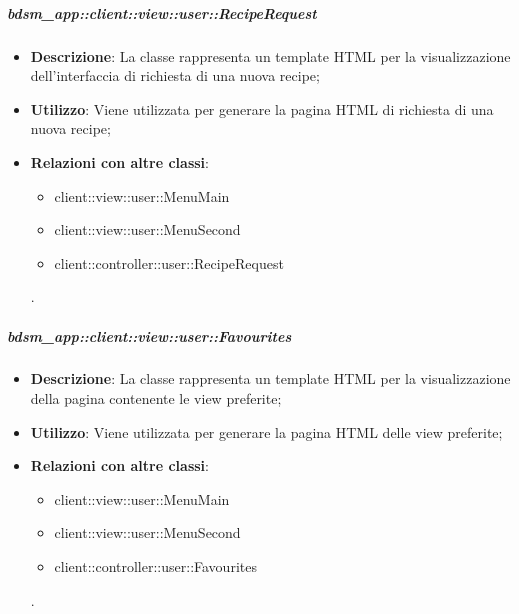 		\subparagraph{bdsm\_app::client::view::user::RecipeRequest} %
		\label{subp:bdsm_app_client_view_user_reciperequest}
			\begin{itemize}
				\item \textbf{Descrizione}: La classe rappresenta un template HTML per la visualizzazione dell'interfaccia di richiesta di una nuova recipe;
				\item \textbf{Utilizzo}: Viene utilizzata per generare la pagina HTML di richiesta di una nuova recipe;
				\item \textbf{Relazioni con altre classi}: 		
					\begin{itemize}
						\item client::view::user::MenuMain
						\item client::view::user::MenuSecond
						\item client::controller::user::RecipeRequest
					\end{itemize}.
			\end{itemize}

		\subparagraph{bdsm\_app::client::view::user::Favourites} %
		\label{subp:bdsm_app_client_view_user_favourites}
			\begin{itemize}
				\item \textbf{Descrizione}: La classe rappresenta un template HTML per la visualizzazione della pagina contenente le view preferite;
				\item \textbf{Utilizzo}: Viene utilizzata per generare la pagina HTML delle view preferite;
				\item \textbf{Relazioni con altre classi}: 		
					\begin{itemize}
						\item client::view::user::MenuMain
						\item client::view::user::MenuSecond
						\item client::controller::user::Favourites					
					\end{itemize}.
			\end{itemize}

